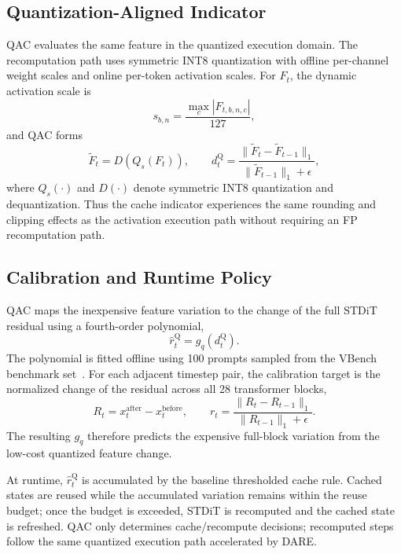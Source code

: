 \documentclass[conference]{IEEEtran}
\begin{document}
\subsection{Quantization-Aligned Indicator}

QAC evaluates the same feature in the quantized execution domain.
The recomputation path uses symmetric INT8 quantization with offline
per-channel weight scales and online per-token activation scales.
For $F_t$, the dynamic activation scale is
\begin{equation}
s_{b,n}=\frac{\max_c |F_{t,b,n,c}|}{127},
\end{equation}
and QAC forms
\begin{equation}
\widetilde F_t=D(Q_s(F_t)),\qquad
d_t^{\mathrm Q}=
\frac{\lVert\widetilde F_t-\widetilde F_{t-1}\rVert_1}
     {\lVert\widetilde F_{t-1}\rVert_1+\epsilon},
\label{eq:q_indicator}
\end{equation}
where $Q_s(\cdot)$ and $D(\cdot)$ denote symmetric INT8 quantization
and dequantization.
Thus the cache indicator experiences the same rounding and clipping
effects as the activation execution path without requiring an FP
recomputation path.

\subsection{Calibration and Runtime Policy}

QAC maps the inexpensive feature variation to the change of the full
STDiT residual using a fourth-order polynomial,
\begin{equation}
\widehat r_t^{\mathrm Q}=g_q(d_t^{\mathrm Q}).
\label{eq:qac_mapping}
\end{equation}
The polynomial is fitted offline using 100 prompts sampled from the
VBench benchmark set~\cite{huang2024vbench}.
For each adjacent timestep pair, the calibration target is the
normalized change of the residual across all 28 transformer blocks,
\begin{equation}
R_t=x_t^{\mathrm{after}}-x_t^{\mathrm{before}},\qquad
r_t=
\frac{\lVert R_t-R_{t-1}\rVert_1}
     {\lVert R_{t-1}\rVert_1+\epsilon}.
\end{equation}
The resulting $g_q$ therefore predicts the expensive full-block
variation from the low-cost quantized feature change.

At runtime, $\widehat r_t^{\mathrm Q}$ is accumulated by the baseline
thresholded cache rule.
Cached states are reused while the accumulated variation remains within
the reuse budget; once the budget is exceeded, STDiT is recomputed and
the cached state is refreshed. QAC only determines cache/recompute decisions; recomputed steps follow the same quantized execution path accelerated by DARE.
\end{document}
